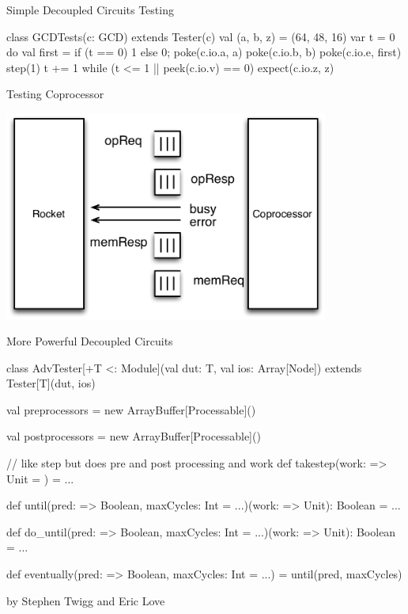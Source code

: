 \documentclass[xcolor=pdflatex,dvipsnames,table]{beamer}
\begin{document}
\begin{frame}[fragile]{Simple Decoupled Circuits Testing}
\begin{scala}
class GCDTests(c: GCD) extends Tester(c) {
  val (a, b, z) = (64, 48, 16)
  var t = 0
  do {
    val first = if (t == 0) 1 else 0;
    poke(c.io.a, a)
    poke(c.io.b, b)
    poke(c.io.e, first)
    step(1)
    t += 1
  } while (t <= 1 || peek(c.io.v) == 0)
  expect(c.io.z, z)
}
\end{scala}
\end{frame}

\begin{frame}[fragile]{Testing Coprocessor}
\begin{center}
\includegraphics[width=0.8\textwidth]{figs/rocket-coprocessor.pdf}
\end{center}
\end{frame}

\begin{frame}[fragile]{More Powerful Decoupled Circuits}

{
\begin{scala}
class AdvTester[+T <: Module](val dut: T, val ios: Array[Node])
    extends Tester[T](dut, ios) {

  val preprocessors = new ArrayBuffer[Processable]()

  val postprocessors = new ArrayBuffer[Processable]()

  // like step but does pre and post processing and work
  def takestep(work: => Unit = {}) = ...

  def until(pred: => Boolean, maxCycles: Int = ...)(work: => Unit): Boolean = ...

  def do_until(pred: => Boolean, maxCycles: Int = ...)(work: => Unit): Boolean = ...

  def eventually(pred: => Boolean, maxCycles: Int = ...) = 
    until(pred, maxCycles){ }
}
\end{scala}
}
\vfill 
{\tiny by Stephen Twigg and Eric Love}
\end{frame}
\end{document}

